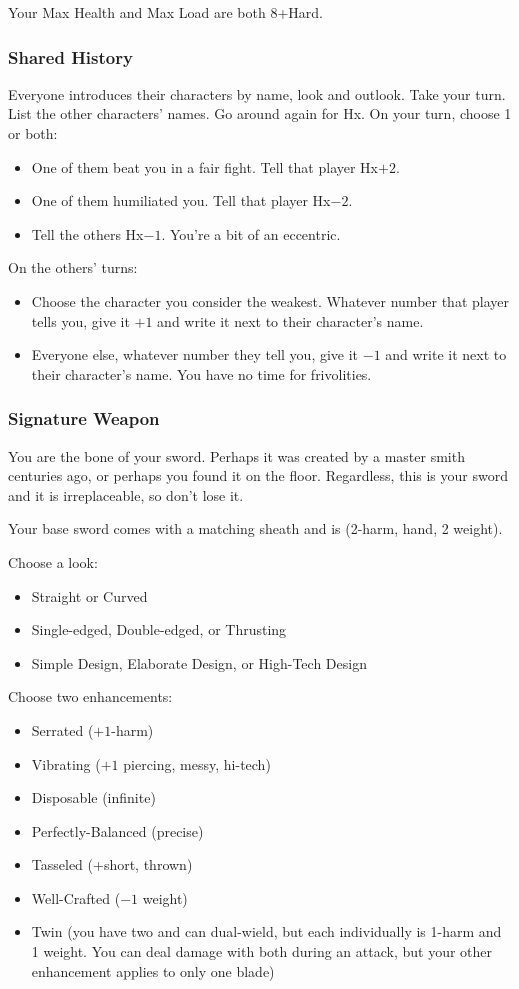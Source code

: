 Your Max Health and Max Load are both 8+Hard.

\subsubsection{Shared History}
Everyone introduces their characters by name, look and outlook. Take
your turn.  List the other characters' names.  Go around again for
Hx. On your turn, choose 1 or both:
\begin{itemize} %
\item One of them beat you in a fair fight. Tell that player Hx$+2$.
\item One of them humiliated you. Tell that player Hx$-2$.
\item Tell the others Hx$-1$. You're a bit of an eccentric.
\end{itemize}
On the others’ turns:
\begin{itemize} %
\item Choose the character you consider the weakest. Whatever number
  that player tells you, give it $+1$ and write it next to their
  character's name.
\item Everyone else, whatever number they tell you, give it $-1$ and
  write it next to their character’s name. You have no time for
  frivolities.
\end{itemize}

\subsubsection{Signature Weapon}
You are the bone of your sword. Perhaps it was created by a master smith centuries ago, or perhaps you found it on the floor. Regardless, this is your sword and it is irreplaceable, so don't lose it.

Your base sword comes with a matching sheath and is (2-harm, hand, 2 weight).

Choose a look:
\begin{itemize}
\item Straight or Curved
\item Single-edged, Double-edged, or Thrusting
\item Simple Design, Elaborate Design, or High-Tech Design
\end{itemize}

Choose two enhancements:
\begin{itemize}
\item Serrated ($+1$-harm)
\item Vibrating ($+1$ piercing, messy, hi-tech)
\item Disposable (infinite)
\item Perfectly-Balanced (precise)
\item Tasseled (+short, thrown)
\item Well-Crafted ($-1$ weight)
\item Twin (you have two and can dual-wield, but each individually is 1-harm and 1 weight. You can deal damage with both during an attack, but your other enhancement applies to only one blade)
\end{itemize}

